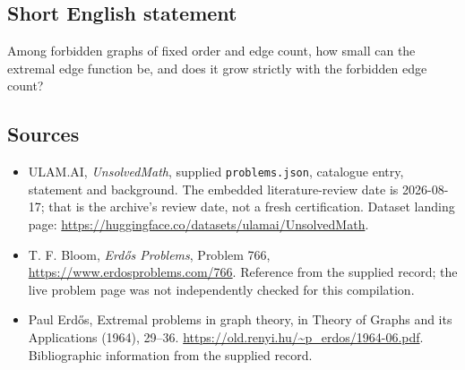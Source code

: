\documentclass[11pt,a4paper]{article}
\begin{document}
\subsection{Short English statement}

Among forbidden graphs of fixed order and edge count, how small can the extremal edge function be, and does it grow strictly with the forbidden edge count?

\subsection{Sources}

{\small

\begin{itemize}

\item[\hypertarget{source:statement:1}{S1}] ULAM.AI, \emph{UnsolvedMath}, supplied \texttt{problems.json}, catalogue entry, statement and background. The embedded literature-review date is 2026-08-17; that is the archive’s review date, not a fresh certification. Dataset landing page: \url{https://huggingface.co/datasets/ulamai/UnsolvedMath}.

\item[\hypertarget{source:statement:2}{S2}] T. F. Bloom, \emph{Erdős Problems}, Problem 766, \url{https://www.erdosproblems.com/766}. Reference from the supplied record; the live problem page was not independently checked for this compilation.

\item[\hypertarget{source:statement:3}{S3}] Paul Erdős, Extremal problems in graph theory, in Theory of Graphs and its Applications (1964), 29--36. \url{https://old.renyi.hu/~p_erdos/1964-06.pdf}. Bibliographic information from the supplied record.

\end{itemize}

}

\label{end:statement}
\end{document}
